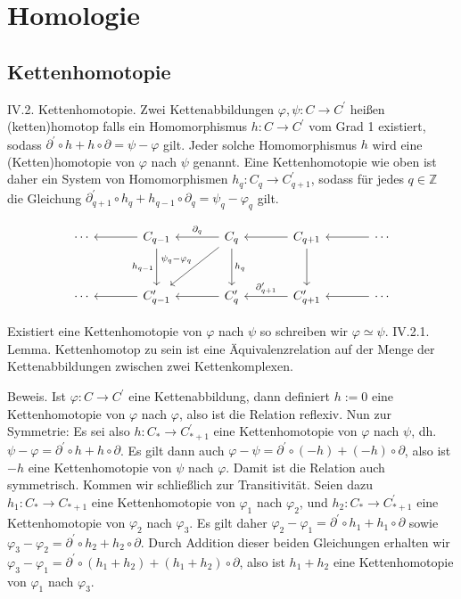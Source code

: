 \documentclass[10pt, letterpaper]{article}
\begin{document}
\pagebreak

\section{Homologie}





\subsection{Kettenhomotopie}

IV.2. Kettenhomotopie. Zwei Kettenabbildungen $\varphi, \psi: C \rightarrow C^{\prime}$ heißen (ketten)homotop falls ein Homomorphismus $h: C \rightarrow C^{\prime}$ vom Grad 1 existiert, sodass $\partial^{\prime} \circ h+h \circ \partial=\psi-\varphi$ gilt. Jeder solche Homomorphismus $h$ wird eine (Ketten)homotopie von $\varphi$ nach $\psi$ genannt. Eine Kettenhomotopie wie oben ist daher ein System von Homomorphismen $h_q: C_q \rightarrow C_{q+1}^{\prime}$, sodass für jedes $q \in \mathbb{Z}$ die Gleichung $\partial_{q+1}^{\prime} \circ h_q+h_{q-1} \circ \partial_q=\psi_q-\varphi_q$ gilt.

\[
\begin{tikzcd}[column sep=3.5em, row sep=3em]
\cdots & C_{q-1} \arrow[l] \arrow[d, "h_{q-1}"'] & C_q \arrow[l, "\partial_q"'] \arrow[d, "h_q"] \arrow[dl, "\psi_q - \varphi_q"'] & C_{q+1} \arrow[l] \arrow[d] & \cdots \arrow[l] \\
\cdots & C'_{q-1} \arrow[l] & C'_q \arrow[l] & C'_{q+1} \arrow[l, "\partial'_{q+1}"'] & \cdots \arrow[l]
\end{tikzcd}
\]


Existiert eine Kettenhomotopie von $\varphi$ nach $\psi$ so schreiben wir $\varphi \simeq \psi$.
IV.2.1. Lemma. Kettenhomotop zu sein ist eine Äquivalenzrelation auf der Menge der Kettenabbildungen zwischen zwei Kettenkomplexen.

Beweis. Ist $\varphi: C \rightarrow C^{\prime}$ eine Kettenabbildung, dann definiert $h:=0$ eine Kettenhomotopie von $\varphi$ nach $\varphi$, also ist die Relation reflexiv. Nun zur Symmetrie: Es sei also $h: C_* \rightarrow C_{*+1}^{\prime}$ eine Kettenhomotopie von $\varphi$ nach $\psi$, dh. $\psi-\varphi=\partial^{\prime} \circ h+h \circ \partial$. Es gilt dann auch $\varphi-\psi=\partial^{\prime} \circ(-h)+(-h) \circ \partial$, also ist $-h$ eine Kettenhomotopie von $\psi$ nach $\varphi$. Damit ist die Relation auch symmetrisch. Kommen wir schließlich zur Transitivität. Seien dazu $h_1: C_* \rightarrow C_{*+1}$ eine Kettenhomotopie von $\varphi_1$ nach $\varphi_2$, und $h_2: C_* \rightarrow C_{*+1}^{\prime}$ eine Kettenhomotopie von $\varphi_2$ nach $\varphi_3$. Es gilt daher $\varphi_2-\varphi_1=\partial^{\prime} \circ h_1+h_1 \circ \partial$ sowie $\varphi_3-\varphi_2=\partial^{\prime} \circ h_2+h_2 \circ \partial$. Durch Addition dieser beiden Gleichungen erhalten wir $\varphi_3-\varphi_1=\partial^{\prime} \circ\left(h_1+h_2\right)+\left(h_1+h_2\right) \circ \partial$, also ist $h_1+h_2$ eine Kettenhomotopie von $\varphi_1$ nach $\varphi_3$.
\end{document}
